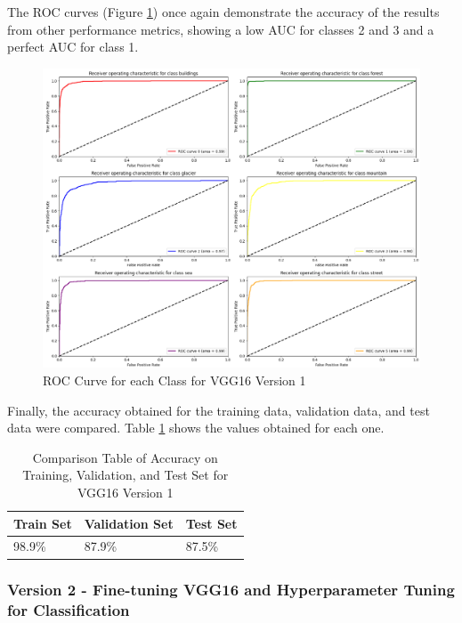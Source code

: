 \documentclass[conference]{IEEEtran}
\begin{document}
The ROC curves (Figure \ref{fig:rocCurvesVGG16_1}) once again demonstrate the accuracy of the results from other performance metrics, showing a low AUC for classes 2 and 3 and a perfect AUC for class 1.

\begin{figure}[H]
    \centering
    \includegraphics[width=1\linewidth]{images/rocCurvesVGG16_1.png}
    \caption{ROC Curve for each Class for VGG16 Version 1}
    \label{fig:rocCurvesVGG16_1}
\end{figure}

Finally, the accuracy obtained for the training data, validation data, and test data were compared. Table \ref{tab:accVGG16_1} shows the values obtained for each one.

\begin{table}[H]
    \centering
    \caption{Comparison Table of Accuracy on Training, Validation, and Test Set for VGG16 Version 1}
    \renewcommand{\arraystretch}{1.5}
    \begin{tabularx}{0.8\linewidth}{|X|X|X|}
    \hline
    \cellcolor[HTML]{EFEFEF}\textbf{Train Set} & \cellcolor[HTML]{EFEFEF}\textbf{Validation Set} & \cellcolor[HTML]{EFEFEF}\textbf{Test Set} \\ \hline
     98.9\%  & 87.9\%  & 87.5\%\\ \hline
    \end{tabularx}
    \label{tab:accVGG16_1}
\end{table}

\subsubsection{Version 2 - Fine-tuning VGG16 and Hyperparameter Tuning for Classification}
\hfill\\
\end{document}
